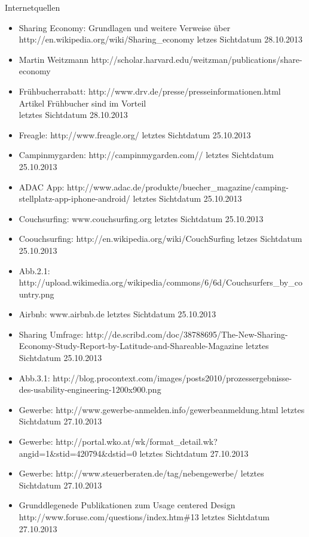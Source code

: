 Internetquellen 
\begin{itemize}
\item
Sharing Economy: Grundlagen und weitere Verweise über http://en.wikipedia.org/wiki/Sharing_economy letzes Sichtdatum 28.10.2013
\item
Martin Weitzmann http://scholar.harvard.edu/weitzman/publications/share-economy
\item
Frühbucherrabatt: http://www.drv.de/presse/presseinformationen.html Artikel Frühbucher sind im Vorteil\\  letztes Sichtdatum 28.10.2013
\item
Freagle: http://www.freagle.org/ letztes Sichtdatum 25.10.2013
\item
Campinmygarden: http://campinmygarden.com// letztes Sichtdatum 25.10.2013
\item
ADAC App: http://www.adac.de/produkte/buecher\_magazine/camping-stellplatz-app-iphone-android/ letztes Sichtdatum 25.10.2013
\item
Couchsurfing: www.couchsurfing.org letztes Sichtdatum 25.10.2013
\item
Coouchsurfing: http://en.wikipedia.org/wiki/CouchSurfing letzes Sichtdatum 25.10.2013
\item
Abb.2.1: http://upload.wikimedia.org/wikipedia/commons/6/6d/Couchsurfers\_by\_country.png
\item
Airbnb: www.airbnb.de letztes Sichtdatum 25.10.2013
\item
Sharing Umfrage: http://de.scribd.com/doc/38788695/The-New-Sharing-Economy-Study-Report-by-Latitude-and-Shareable-Magazine letztes Sichtdatum 25.10.2013
\item
Abb.3.1: http://blog.procontext.com/images/posts2010/prozessergebnisse-des-usability-engineering-1200x900.png
\item
Gewerbe: http://www.gewerbe-anmelden.info/gewerbeanmeldung.html letztes Sichtdatum 27.10.2013
\item
Gewerbe: http://portal.wko.at/wk/format\_detail.wk?angid=1\&stid=420794\&dstid=0 letztes Sichtdatum 27.10.2013
\item
Gewerbe: http://www.steuerberaten.de/tag/nebengewerbe/ letztes Sichtdatum 27.10.2013
\item
Grunddlegenede Publikationen zum Usage centered Design \\http://www.foruse.com/questions/index.htm\#13 letztes Sichtdatum 27.10.2013


\end{itemize}

\newpage
